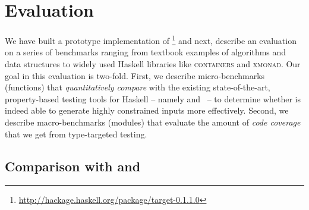 \section{Evaluation} \label{sec:evaluation}

We have built a prototype implementation of \toolname\footnote{\url{http://hackage.haskell.org/package/target-0.1.1.0}} and next, 
describe an evaluation on a series of benchmarks ranging from 
textbook examples of algorithms and data structures to widely 
used Haskell libraries like \textsc{containers} and \textsc{xmonad}.
%
Our goal in this evaluation is two-fold. 
%
First, we describe micro-benchmarks (\ie functions)
that \emph{quantitatively compare} \toolname with 
the existing state-of-the-art, property-based testing
tools for Haskell -- namely \smallcheck and \quickcheck\ -- 
to determine whether \toolname is indeed able to generate
highly constrained inputs more effectively.
%
Second, we describe macro-benchmarks (\ie modules) that 
evaluate the amount of \emph{code coverage} that we 
get from type-targeted testing.
%




\subsection{Comparison with \quickcheck and \smallcheck}\label{sec:comparison}


